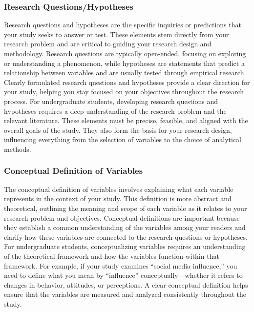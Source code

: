 \documentclass[
]{book}
\begin{document}
\subsubsection*{Research Questions/Hypotheses}\label{research-questionshypotheses}

Research questions and hypotheses are the specific inquiries or predictions that your study seeks to answer or test. These elements stem directly from your research problem and are critical to guiding your research design and methodology. Research questions are typically open-ended, focusing on exploring or understanding a phenomenon, while hypotheses are statements that predict a relationship between variables and are usually tested through empirical research. Clearly formulated research questions and hypotheses provide a clear direction for your study, helping you stay focused on your objectives throughout the research process. For undergraduate students, developing research questions and hypotheses requires a deep understanding of the research problem and the relevant literature. These elements must be precise, feasible, and aligned with the overall goals of the study. They also form the basis for your research design, influencing everything from the selection of variables to the choice of analytical methods.

\subsubsection*{Conceptual Definition of Variables}\label{conceptual-definition-of-variables}

The conceptual definition of variables involves explaining what each variable represents in the context of your study. This definition is more abstract and theoretical, outlining the meaning and scope of each variable as it relates to your research problem and objectives. Conceptual definitions are important because they establish a common understanding of the variables among your readers and clarify how these variables are connected to the research questions or hypotheses. For undergraduate students, conceptualizing variables requires an understanding of the theoretical framework and how the variables function within that framework. For example, if your study examines ``social media influence,'' you need to define what you mean by ``influence'' conceptually---whether it refers to changes in behavior, attitudes, or perceptions. A clear conceptual definition helps ensure that the variables are measured and analyzed consistently throughout the study.
\end{document}
